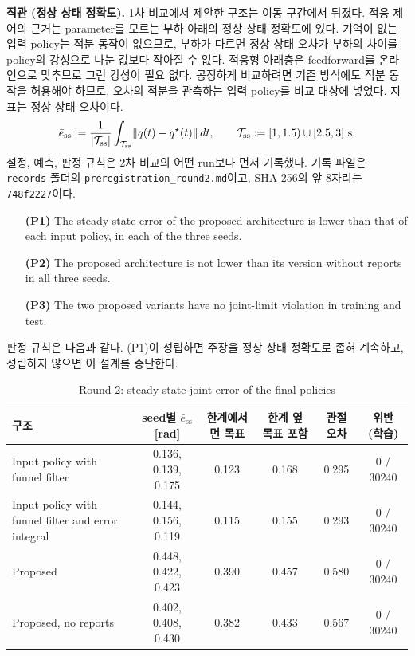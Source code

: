 \documentclass[11pt]{article}\usepackage[margin=1in]{geometry}\usepackage{amsmath,amssymb,amsthm,mathtools}\usepackage{graphicx}\graphicspath{{figures/}{../figures/}{figs/}{./}}\usepackage{enumitem}\usepackage{hyperref}\usepackage{cleveref}\usepackage{tikz}\usetikzlibrary{arrows.meta,positioning,calc,shapes.geometric}\usepackage{float}\usepackage[most]{tcolorbox}\usepackage{kotex}\usepackage{booktabs}\emergencystretch=1.6em\tolerance=2000 \crefname{assumption}{Assumption}{Assumptions}\Crefname{assumption}{Assumption}{Assumptions}\crefname{definition}{Definition}{Definitions}\Crefname{definition}{Definition}{Definitions}\crefname{proposition}{Proposition}{Propositions}\Crefname{proposition}{Proposition}{Propositions}\crefname{fact}{Fact}{Facts}\Crefname{fact}{Fact}{Facts} \newtheorem{assumption}{Assumption}\newtheorem{definition}{Definition}\newtheorem{lemma}{Lemma}\newtheorem{proposition}{Proposition}\newtheorem{theorem}{Theorem}\newtheorem{corollary}{Corollary}\newtheorem{fact}{Fact}\theoremstyle{remark}\newtheorem{remark}{Remark} \newcommand{\R}{\mathbb{R}}\newcommand{\U}{\mathcal U}
\begin{document}
\textbf{직관 (정상 상태 정확도).} 1차 비교에서 제안한 구조는 이동 구간에서 뒤졌다. 적응 제어의 근거는 parameter를 모르는 부하 아래의 정상 상태 정확도에 있다. 기억이 없는 입력 policy는 적분 동작이 없으므로, 부하가 다르면 정상 상태 오차가 부하의 차이를 policy의 강성으로 나눈 값보다 작아질 수 없다. 적응형 아래층은 feedforward를 온라인으로 맞추므로 그런 강성이 필요 없다. 공정하게 비교하려면 기존 방식에도 적분 동작을 허용해야 하므로, 오차의 적분을 관측하는 입력 policy를 비교 대상에 넣었다. 지표는 정상 상태 오차이다.
\[
\bar e_{\mathrm{ss}}:=\frac{1}{|\mathcal T_{\mathrm{ss}}|}\int_{\mathcal T_{\mathrm{ss}}}\lVert q(t)-q^\star(t)\rVert\,dt,\qquad \mathcal T_{\mathrm{ss}}:=[1,1.5)\cup[2.5,3]\ \text{s}.
\]
설정, 예측, 판정 규칙은 2차 비교의 어떤 run보다 먼저 기록했다. 기록 파일은 \texttt{records} 폴더의 \texttt{preregistration\_round2.md}이고, SHA-256의 앞 8자리는 \texttt{748f2227}이다.
\begin{itemize}
\item[\textbf{(P1)}] The steady-state error of the proposed architecture is lower than that of each input policy, in each of the three seeds.
\item[\textbf{(P2)}] The proposed architecture is not lower than its version without reports in all three seeds.
\item[\textbf{(P3)}] The two proposed variants have no joint-limit violation in training and test.
\end{itemize}
판정 규칙은 다음과 같다. (P1)이 성립하면 주장을 정상 상태 정확도로 좁혀 계속하고, 성립하지 않으면 이 설계를 중단한다.

\begin{table}[H]
\centering\footnotesize\setlength{\tabcolsep}{4pt}
\caption{Round 2: steady-state joint error of the final policies}
\label{tab:r2}
\begin{tabular}{p{4.3cm}ccccc}
\toprule
구조 & seed별 $\bar e_{\mathrm{ss}}$ [rad] & 한계에서 먼 목표 & 한계 옆 목표 포함 & 관절 오차 & 위반 (학습) \\
\midrule
Input policy with funnel filter & 0.136, 0.139, 0.175 & 0.123 & 0.168 & 0.295 & 0 / 30240 \\
Input policy with funnel filter and error integral & 0.144, 0.156, 0.119 & 0.115 & 0.155 & 0.293 & 0 / 30240 \\
Proposed & 0.448, 0.422, 0.423 & 0.390 & 0.457 & 0.580 & 0 / 30240 \\
Proposed, no reports & 0.402, 0.408, 0.430 & 0.382 & 0.433 & 0.567 & 0 / 30240 \\
\bottomrule
\end{tabular}
\end{table}
\end{document}
